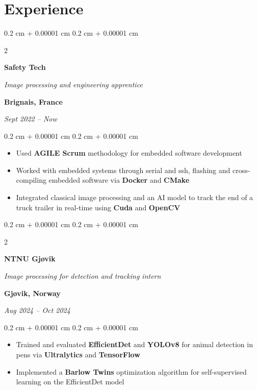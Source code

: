\documentclass[10pt, letterpaper]{article}
\newenvironment{highlights}{
    \begin{itemize}[
        topsep=0.10 cm,
        parsep=0.10 cm,
        partopsep=0pt,
        itemsep=0pt,
        leftmargin=0.4 cm + 10pt
    ]
}{
    \end{itemize}
} %
\newenvironment{onecolentry}{
    \begin{adjustwidth}{
        0.2 cm + 0.00001 cm
    }{
        0.2 cm + 0.00001 cm
    }
}{
    \end{adjustwidth}
} %
\newenvironment{twocolentry}[2][]{
    \onecolentry
    \def\secondColumn{#2}
    \setcolumnwidth{\fill, 6 cm}
    \begin{paracol}{2}
}{
    \switchcolumn \raggedleft \secondColumn
    \end{paracol}
    \endonecolentry
} %
\begin{document}

    \section{Experience}
        \begin{twocolentry}{
			\textbf{Brignais, France}

			\textit{Sept 2022 – Now}}
            \textbf{Safety Tech}

            \textit{Image processing and engineering apprentice}
        \end{twocolentry}

        \vspace{0.2 cm}
        \begin{onecolentry}
            \begin{highlights}
                \item Used \textbf{AGILE Scrum} methodology for embedded software development
				\item Worked with embedded systems through serial and ssh, flashing and cross-compiling embedded software via \textbf{Docker} and \textbf{CMake}
				\item Integrated classical image processing and an AI model to track the end of a truck trailer in real-time using \textbf{Cuda} and \textbf{OpenCV}
            \end{highlights}
        \end{onecolentry}

		\vspace{0.6 cm}
        \begin{twocolentry}{
			\textbf{Gjøvik, Norway}

			\textit{Aug 2024 – Oct 2024}}
			\textbf{NTNU Gjøvik}

			\textit{Image processing for detection and tracking intern}
        \end{twocolentry}

        \vspace{0.2 cm}
        \begin{onecolentry}
            \begin{highlights}
                \item Trained and evaluated \textbf{EfficientDet} and \textbf{YOLOv8} for animal detection in pens via \textbf{Ultralytics} and \textbf{TensorFlow}
                \item Implemented a \textbf{Barlow Twins} optimization algorithm for self-supervised learning on the EfficientDet model
            \end{highlights}
        \end{onecolentry}
\end{document}
